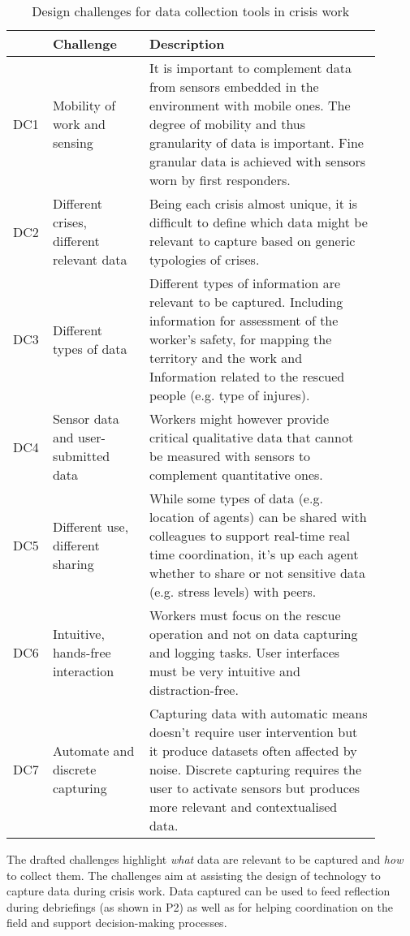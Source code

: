 \begin{table}
	[p] \centering \caption{Design challenges for data collection tools in crisis work} \label{tab:design-challenges} 
	\begin{tabular}
		{@{}p{0.05\linewidth}p{0.25\linewidth}p{0.60\linewidth}@{}} \toprule & Challenge & Description \\
		\midrule DC1 & Mobility of work and sensing & It is important to complement data from sensors embedded in the environment with mobile ones. The degree of mobility and thus granularity of data is important. Fine granular data is achieved with sensors worn by first responders. \\
		DC2 & Different crises, different relevant data & Being each crisis almost unique, it is difficult to define which data might be relevant to capture based on generic typologies of crises. \\
		DC3 & Different types of data & Different types of information are relevant to be captured. Including information for assessment of the worker’s safety, for mapping the territory and the work and Information related to the rescued people (e.g. type of injures). \\
		DC4 & Sensor data and user-submitted data & Workers might however provide critical qualitative data that cannot be measured with sensors to complement quantitative ones. \\
		DC5 & Different use, different sharing & While some types of data (e.g. location of agents) can be shared with colleagues to support real-time real time coordination, it's up each agent whether to share or not sensitive data (e.g. stress levels) with peers. \\
		DC6 & Intuitive, hands-free interaction & Workers must focus on the rescue operation and not on data capturing and logging tasks. User interfaces must be very intuitive and distraction-free. \\
		DC7 & Automate and discrete capturing & Capturing data with automatic means doesn't require user intervention but it produce datasets often affected by noise. Discrete capturing requires the user to activate sensors but produces more relevant and contextualised data. \\
		\bottomrule 
	\end{tabular}
\end{table}

The drafted challenges highlight \emph{what} data are relevant to be captured and \emph{how} to collect them. The challenges aim at assisting the design of technology to capture data during crisis work. Data captured can be used to feed reflection during debriefings (as shown in P2) as well as for helping coordination on the field and support decision-making processes.

